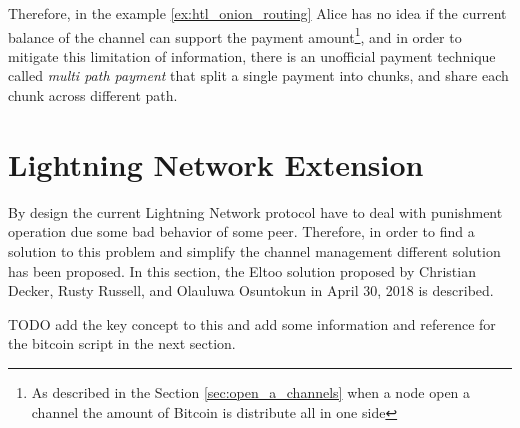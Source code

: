 Therefore, in the example \ref{ex:htl_onion_routing} Alice has no idea if the current balance of the channel can support the payment amount\footnote{As described in the Section \ref{sec:open_a_channels} when a node open a channel the amount of Bitcoin is distribute all in one side}, and in order to mitigate this limitation of information, there is an unofficial payment technique called \emph{multi path payment} that split a single payment into chunks, and share each chunk across different path.

\section{Lightning Network Extension}
\label{sec:eltoo}

By design the current Lightning Network protocol have to deal with punishment operation due some bad behavior of some peer. Therefore, in order
to find a solution to this problem and simplify the channel management different solution has been proposed.
In this section, the Eltoo\cite{eltoo} solution proposed by Christian Decker, Rusty Russell, and Olauluwa Osuntokun in April 30, 2018 is described.

TODO add the key concept to this and add some information and reference for the bitcoin script in the next section.
